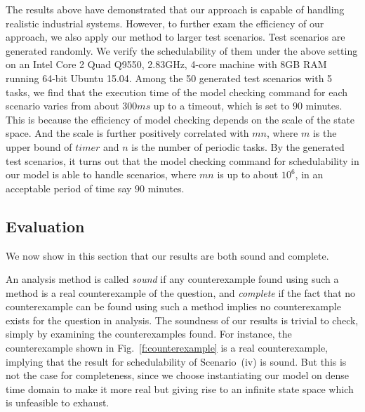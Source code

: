\documentclass[12pt,onecolumn]{IEEEtranTIE}
\begin{document}
The results above have demonstrated that our approach is capable of
handling realistic industrial systems. However, to further exam the
efficiency of our approach, we also apply our method to larger test
scenarios. Test scenarios are generated randomly. We verify the
schedulability of them under the above setting on an Intel Core 2 Quad
Q9550, 2.83GHz, 4-core machine with 8GB RAM running 64-bit Ubuntu
15.04. Among the 50 generated test scenarios with 5 tasks, we find
that the execution time of the model checking command for each
scenario varies from about $300ms$ up to a timeout, which is set to
$90$ minutes. This is because the efficiency of model checking depends
on the scale of the state space. And the scale is further positively
correlated with $mn$, where $m$ is the upper bound of $\mathit{timer}$
and $n$ is the number of periodic tasks. By the generated test
scenarios, it turns out that the model checking command for
schedulability in our model is able to handle scenarios, where $mn$ is
up to about $10^6$, in an acceptable period of time say $90$ minutes.


\subsection{Evaluation}
We now show in this section that our results are both sound and
complete.

An analysis method is called \emph{sound} if any counterexample found
using such a method is a real counterexample of the question, and
\emph{complete} if the fact that no counterexample can be found using
such a method implies no counterexample exists for the question in
analysis. The soundness of our results is trivial to check, simply by
examining the counterexamples found. For instance, the counterexample
shown in Fig.~\ref{f:counterexample} is a real counterexample,
implying that the result for schedulability of Scenario~(iv) is
sound. But this is not the case for completeness, since we choose
instantiating our model on dense time domain to make it more real but
giving rise to an infinite state space which is unfeasible to exhaust.
\end{document}
